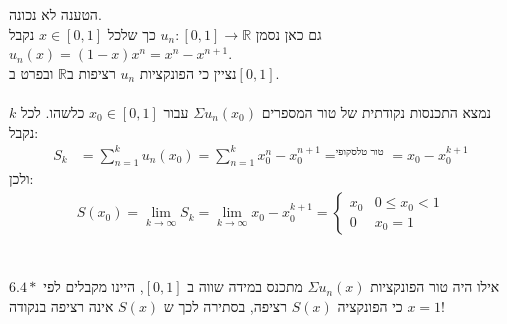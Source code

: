 \documentclass{article}
\DeclareMathOperator*{\equals}{=}
\def\reals{\mathbb{R}}
\begin{document}
הטענה לא נכונה. \\
גם כאן נסמן $u_n: [0,1]\rightarrow \reals$ כך שלכל $x\in[0,1]$ נקבל $u_n(x)=(1-x)x^n=x^n-x^{n+1}$. \\
נציין כי הפונקציות $u_n$ רציפות ב$\reals$ ובפרט ב$[0,1]$. \\\\
נמצא התכנסות נקודתית של טור המספרים $\Sigma u_n(x_0)$ עבור $x_0\in[0,1]$ כלשהו. לכל $k$ נקבל:
\begin{align*}
    S_k & =\sum_{n=1}^k u_n(x_0)=\sum_{n=1}^k x_0^{n}-x_0^{n+1} \equals^{\text{טור טלסקופי}}= x_0 - x_0^{k+1}
\end{align*}
ולכן:
\begin{align*}
    S(x_0)=
    \lim_{k\rightarrow \infty} S_k=
    \lim_{k\rightarrow \infty} x_0 - x_0^{k+1}=
    \begin{cases}
        x_0 & 0\leq x_0 < 1 \\
        0   & x_0 = 1
    \end{cases}
\end{align*}
\\\\
אילו היה טור הפונקציות $\Sigma u_n(x)$ מתכנס במידה שווה ב $[0,1]$, היינו מקבלים לפי $6.4*$ כי הפונקציה $S(x)$ רציפה, בסתירה לכך ש $S(x)$ אינה רציפה בנקודה $x=1$!
\end{document}
